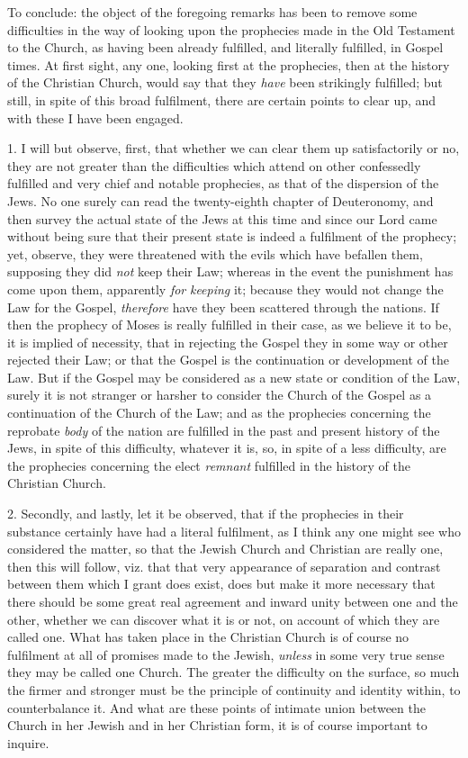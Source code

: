 To conclude: the object of the foregoing remarks has been to remove
some difficulties in the way of looking upon the prophecies made in
the Old Testament to the Church, as having been already fulfilled, and
literally fulfilled, in Gospel times. At first sight, any one, looking
first at the prophecies, then at the history of the Christian Church,
would say that they \emph{have} been strikingly fulfilled; but still,
in spite of this broad fulfilment, there are certain points to clear
up, and with these I have been engaged.

1. I will but observe, first, that whether we can clear them up
satisfactorily or no, they are not greater than the difficulties which
attend on other confessedly fulfilled and very chief and notable
prophecies, as that of the dispersion of the Jews. No one surely can
read the twenty-eighth chapter of Deuteronomy, and then survey the
actual state of the Jews at this time and since our Lord came without
being sure that their present state is indeed a fulfilment of the
prophecy; yet, observe, they were threatened with the evils which have
befallen them, supposing they did \emph{not} keep their Law; whereas
in the event the punishment has come upon them, apparently \emph{for} \emph{keeping}
it; because they would not change the Law for the Gospel, \emph{therefore}
have they been scattered through the nations. If then the prophecy of
Moses is really fulfilled in their case, as we believe it to be, it is
implied of necessity, that in rejecting the Gospel they in some way or
other rejected their Law; or that the Gospel is the continuation or
development of the Law. But if the Gospel may be considered as a new
state or condition of the Law, surely it is not stranger or harsher to
consider the Church of the Gospel as a continuation of the Church of
the Law; and as the prophecies concerning the reprobate \emph{body} of
the nation are fulfilled in the past and present history of the Jews,
in spite of this difficulty, whatever it is, so, in spite of a less
difficulty, are the prophecies concerning the elect \emph{remnant}
fulfilled in the history of the Christian Church.

2. Secondly, and lastly, let it be observed, that if the prophecies
in their substance certainly have had a literal fulfilment, as I think
any one might see who considered the matter, so that the Jewish Church
and Christian are really one, then this will follow, viz. that that
very appearance of separation and contrast between them which I grant
does exist, does but make it more necessary that there should be some
great real agreement and inward unity between one and the other,
whether we can discover what it is or not, on account of which they
are called one. What has taken place in the Christian Church is of
course no fulfilment at all of promises made to the Jewish, \emph{unless}
in some very true sense they may be called one Church. The greater the
difficulty on the surface, so much the firmer and stronger must be the
principle of continuity and identity within, to counterbalance it. And
what are these points of intimate union between the Church in her
Jewish and in her Christian form, it is of course important to
inquire.

